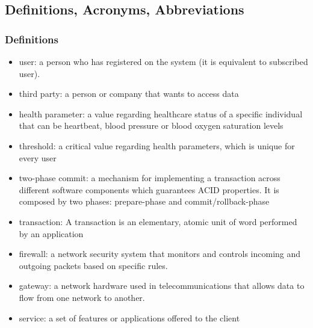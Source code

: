 \subsection{Definitions, Acronyms, Abbreviations}

\subsubsection{Definitions}
\begin{itemize}
\item user: a person who has registered on the system (it is equivalent to subscribed user).
\item third party: a person or company that wants to access data
\item health parameter: a value regarding healthcare status of a specific individual that can be heartbeat, blood pressure or blood oxygen saturation levels 
\item threshold: a critical value regarding health parameters, which is unique for every user
\item two-phase commit: a mechanism for implementing a transaction across different software components which guarantees ACID properties. It is composed by two phases: prepare-phase and commit/rollback-phase
\item transaction: A transaction is an elementary, atomic unit of word performed by an application
\item firewall:  a network security system that monitors and controls incoming and outgoing packets based on specific rules.
\item gateway: a network hardware used in telecommunications that allows data to flow from one network to another.
\item service: a set of features or applications offered to the client
\end{itemize}

